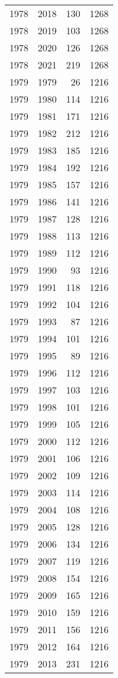 \documentclass[
  11pt,
  letterpaper,
  DIV=11,
  numbers=noendperiod,
  twoside]{scrartcl}
\begin{document}
\begin{longtable}[]{@{}rrrr@{}}
1978 & 2018 & 130 & 1268 \\
1978 & 2019 & 103 & 1268 \\
1978 & 2020 & 126 & 1268 \\
1978 & 2021 & 219 & 1268 \\
1979 & 1979 & 26 & 1216 \\
1979 & 1980 & 114 & 1216 \\
1979 & 1981 & 171 & 1216 \\
1979 & 1982 & 212 & 1216 \\
1979 & 1983 & 185 & 1216 \\
1979 & 1984 & 192 & 1216 \\
1979 & 1985 & 157 & 1216 \\
1979 & 1986 & 141 & 1216 \\
1979 & 1987 & 128 & 1216 \\
1979 & 1988 & 113 & 1216 \\
1979 & 1989 & 112 & 1216 \\
1979 & 1990 & 93 & 1216 \\
1979 & 1991 & 118 & 1216 \\
1979 & 1992 & 104 & 1216 \\
1979 & 1993 & 87 & 1216 \\
1979 & 1994 & 101 & 1216 \\
1979 & 1995 & 89 & 1216 \\
1979 & 1996 & 112 & 1216 \\
1979 & 1997 & 103 & 1216 \\
1979 & 1998 & 101 & 1216 \\
1979 & 1999 & 105 & 1216 \\
1979 & 2000 & 112 & 1216 \\
1979 & 2001 & 106 & 1216 \\
1979 & 2002 & 109 & 1216 \\
1979 & 2003 & 114 & 1216 \\
1979 & 2004 & 108 & 1216 \\
1979 & 2005 & 128 & 1216 \\
1979 & 2006 & 134 & 1216 \\
1979 & 2007 & 119 & 1216 \\
1979 & 2008 & 154 & 1216 \\
1979 & 2009 & 165 & 1216 \\
1979 & 2010 & 159 & 1216 \\
1979 & 2011 & 156 & 1216 \\
1979 & 2012 & 164 & 1216 \\
1979 & 2013 & 231 & 1216 \\

\end{longtable}
\end{document}
